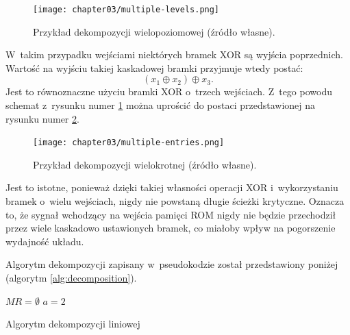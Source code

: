 \begin{figure}[h]
\centering
\texttt{[image: chapter03/multiple-levels.png]}
\caption{Przykład dekompozycji wielopoziomowej (źródło własne).}
\label{fig:multiple-levels}
\end{figure}

W~takim przypadku wejściami niektórych bramek XOR są wyjścia poprzednich.
Wartość na wyjściu takiej kaskadowej bramki przyjmuje wtedy postać:
\begin{equation}
(x_1 \oplus x_2) \oplus x_3.
\end{equation}
Jest to równoznaczne użyciu bramki XOR o~trzech wejściach.
Z~tego powodu schemat z~rysunku numer \ref{fig:multiple-levels} można uprościć do postaci przedstawionej na rysunku numer \ref{fig:multiple-entries}.

\begin{figure}[h]
\centering
\texttt{[image: chapter03/multiple-entries.png]}
\caption{Przykład dekompozycji wielokrotnej (źródło własne).}
\label{fig:multiple-entries}
\end{figure}

Jest to istotne,
ponieważ dzięki takiej własności operacji XOR i~wykorzystaniu bramek o~wielu wejściach,
nigdy nie powstaną długie ścieżki krytyczne.
Oznacza to,
że sygnał wchodzący na wejścia pamięci ROM nigdy nie będzie przechodził przez wiele kaskadowo ustawionych bramek,
co miałoby wpływ na pogorszenie wydajność układu.

Algorytm dekompozycji zapisany w~pseudokodzie został przedstawiony poniżej (algorytm \ref{alg:decomposition}).

\begin{algorithm}[h]
    $MR=\emptyset$\;
    $a = 2$\;
    \While{$a <= n$}{
        \For{$\forall P \subseteq X : \left\vert{P}\right\vert = a$}{
            \If{$\not\exists w_i \in{MR} : \forall x_j \in{X} : MR[i][j] = 1 \iff x_j \in{P}$}{
                $F = H(XOR(P), X \backslash P)$ \;
                Ponów algorytm dla funkcji $F=H$\;
            }
        }
    }
    \caption{Algorytm dekompozycji liniowej}
    \label{alg:decomposition}
\end{algorithm}
%
%
%
